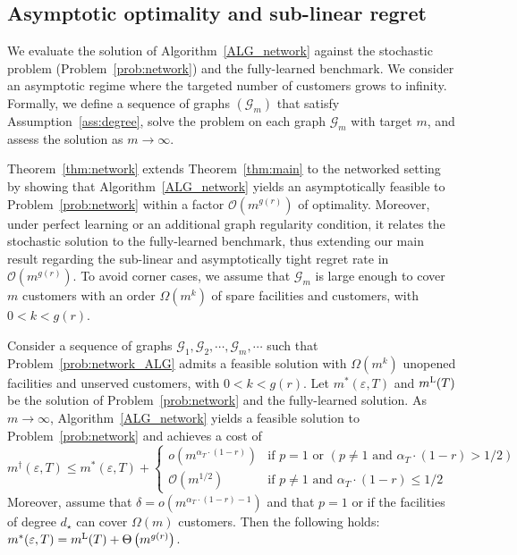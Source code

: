 \documentclass[nonblindrev]{informs3noheader}
\def\calG{\mathcal{G}}
\def\calO{\mathcal{O}}
\begin{document}
\subsection{Asymptotic optimality and sub-linear regret}
\label{subsec:network_thm}

We evaluate the solution of Algorithm~\ref{ALG_network} against the stochastic problem (Problem~\eqref{prob:network}) and the fully-learned benchmark. We consider an asymptotic regime where the targeted number of customers grows to infinity. Formally, we define a sequence of graphs $(\calG_m)$ that satisfy Assumption~\ref{ass:degree}, solve the problem on each graph $\calG_m$ with target $m$, and assess the solution as $m\to\infty$.

Theorem~\ref{thm:network} extends Theorem~\ref{thm:main} to the networked setting by showing that Algorithm~\ref{ALG_network} yields an asymptotically feasible to Problem~\eqref{prob:network} within a factor $\calO(m^{g(r)})$ of optimality. Moreover, under perfect learning or an additional graph regularity condition, it relates the stochastic solution to the fully-learned benchmark, thus extending our main result regarding the sub-linear and asymptotically tight regret rate in $\calO(m^{g(r)})$. To avoid corner cases, we assume that $\calG_m$ is large enough to cover $m$ customers with an order $\Omega(m^k)$ of spare facilities and customers, with $0<k<g(r)$.

\begin{theorem}\label{thm:network}
    Consider a sequence of graphs $\calG_1,\calG_2,\cdots,\calG_m,\cdots$ such that Problem~\eqref{prob:network_ALG} admits a feasible solution with $\Omega(m^k)$ unopened facilities and unserved customers, with $0<k<g(r)$. Let $m^*(\varepsilon,T)$ and $m^{\textsc{L}}(T)$ be the solution of Problem~\eqref{prob:network} and the fully-learned solution. As $m \to \infty$, Algorithm~\ref{ALG_network} yields a feasible solution to Problem~\eqref{prob:network} and achieves a cost of
    $$m^\dagger(\varepsilon, T)\leq m^*(\varepsilon, T)+\begin{cases}
    	o\left(m^{\alpha_T \cdot (1-r)}\right)& \text{if }p=1 \text{ or } (p \neq 1 \text{ and } \alpha_T\cdot(1-r)>1/2)\\
    	\calO(m^{1/2}) & \text{if }p \neq 1\text{ and } \alpha_T\cdot(1-r)\leq 1/2
    \end{cases}$$
    Moreover, assume that $\delta = o\left(m^{\alpha_T\cdot(1-r)-1}\right)$ and that $p=1$ or if the facilities of degree $d_\star$ can cover $\Omega(m)$ customers. Then the following holds: $m^*(\varepsilon, T)= m^{\textsc{L}}(T)+\Theta\left(m^{g(r)}\right)$.
\end{theorem}
\end{document}
